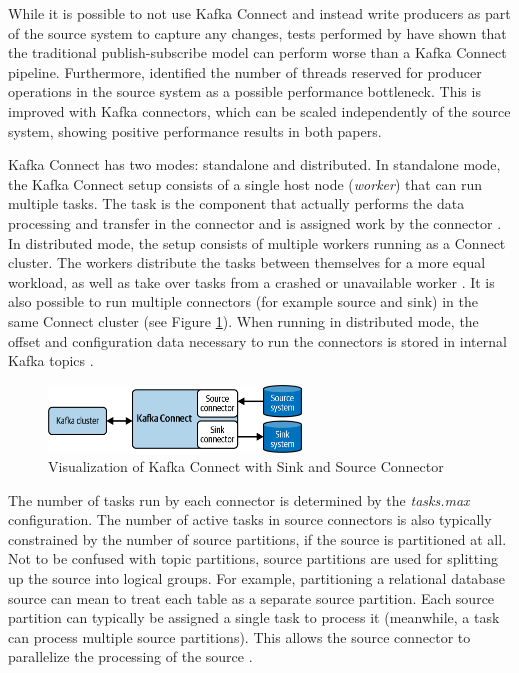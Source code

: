 While it is possible to not use Kafka Connect and instead write producers as part of the source system to capture any changes, tests performed by \cite{srijithkafkaconnectperformance} have shown that the traditional publish-subscribe model can perform worse than a Kafka Connect pipeline. Furthermore, \cite{maison2023kafkaconnect} identified the number of threads reserved for producer operations in the source system as a possible performance bottleneck. This is improved with Kafka connectors, which can be scaled independently of the source system, showing positive performance results in both papers.

Kafka Connect has two modes: standalone and distributed. In standalone mode, the Kafka Connect setup consists of a single host node (\textit{worker}) that can run multiple tasks. The task is the component that actually performs the data processing and transfer in the connector and is assigned work by the connector \cite{kafkadocumentation}. In distributed mode, the setup consists of multiple workers running as a Connect cluster. The workers distribute the tasks between themselves for a more equal workload, as well as take over tasks from a crashed or unavailable worker \cite{maison2023kafkaconnect}. It is also possible to run multiple connectors (for example source and sink) in the same Connect cluster (see Figure \ref{fig:fundamentals:kafkaconnectexample}). When running in distributed mode, the offset and configuration data necessary to run the connectors is stored in internal Kafka topics \cite{kafkadocumentation}.

\begin{figure}[htbp]
 \centering
 \includegraphics[width=0.6\textwidth]{chapters/images/kafkaconnectexample.png}
 \caption[Visualization of Kafka Connect with Sink and Source Connector]{Visualization of Kafka Connect with Sink and Source Connector \cite{maison2023kafkaconnect}}
 \label{fig:fundamentals:kafkaconnectexample}
\end{figure}

The number of tasks run by each connector is determined by the \textit{tasks.max} configuration. The number of active tasks in source connectors is also typically constrained by the number of source partitions, if the source is partitioned at all. Not to be confused with topic partitions, source partitions are used for splitting up the source into logical groups. For example, partitioning a relational database source can mean to treat each table as a separate source partition. Each source partition can typically be assigned a single task to process it (meanwhile, a task can process multiple source partitions). This allows the source connector to parallelize the processing of the source \cite{maison2023kafkaconnect}.

